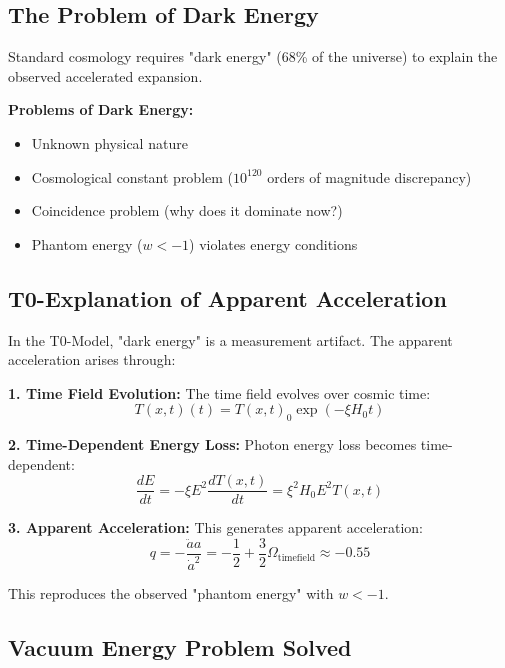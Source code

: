 \documentclass[12pt,a4paper]{report}
\newcommand{\Tfield}{T(x,t)}  %
\newcommand{\xipar}{\xi}      %
\begin{document}
	\subsection{The Problem of Dark Energy}\label{subsec:problem_dark_energy}
	
	Standard cosmology requires "dark energy" (68\% of the universe) to explain the observed accelerated expansion.
	
	\textbf{Problems of Dark Energy:}
	\begin{itemize}
		\item Unknown physical nature
		\item Cosmological constant problem ($10^{120}$ orders of magnitude discrepancy)
		\item Coincidence problem (why does it dominate now?)
		\item Phantom energy ($w < -1$) violates energy conditions
	\end{itemize}
	
	\subsection{T0-Explanation of Apparent Acceleration}\label{subsec:t0_apparent_acceleration}
	
	In the T0-Model, "dark energy" is a measurement artifact. The apparent acceleration arises through:
	
	\textbf{1. Time Field Evolution:}
	The time field evolves over cosmic time:
	\begin{equation}
		\Tfield(t) = \Tfield_0 \exp\left(-\xipar H_0 t\right)
	\end{equation}
	
	\textbf{2. Time-Dependent Energy Loss:}
	Photon energy loss becomes time-dependent:
	\begin{equation}
		\frac{dE}{dt} = -\xipar E^2 \frac{d\Tfield}{dt} = \xipar^2 H_0 E^2 \Tfield
	\end{equation}
	
	\textbf{3. Apparent Acceleration:}
	This generates apparent acceleration:
	\begin{equation}
		q = -\frac{\ddot{a}a}{\dot{a}^2} = -\frac{1}{2} + \frac{3}{2}\Omega_{\text{timefield}} \approx -0.55
	\end{equation}
	
	This reproduces the observed "phantom energy" with $w < -1$.
	
	\subsection{Vacuum Energy Problem Solved}\label{subsec:vacuum_energy_problem}
	
\end{document}
